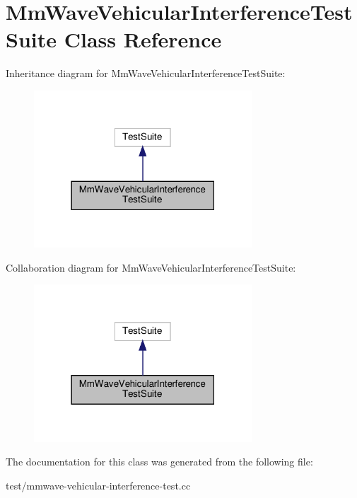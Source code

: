 \hypertarget{classMmWaveVehicularInterferenceTestSuite}{}\section{Mm\+Wave\+Vehicular\+Interference\+Test\+Suite Class Reference}
\label{classMmWaveVehicularInterferenceTestSuite}


Inheritance diagram for Mm\+Wave\+Vehicular\+Interference\+Test\+Suite\+:
\nopagebreak
\begin{figure}[H]
\begin{center}
\leavevmode
\includegraphics[width=231pt]{classMmWaveVehicularInterferenceTestSuite__inherit__graph}
\end{center}
\end{figure}


Collaboration diagram for Mm\+Wave\+Vehicular\+Interference\+Test\+Suite\+:
\nopagebreak
\begin{figure}[H]
\begin{center}
\leavevmode
\includegraphics[width=231pt]{classMmWaveVehicularInterferenceTestSuite__coll__graph}
\end{center}
\end{figure}


The documentation for this class was generated from the following file\+:\begin{DoxyCompactItemize}
\item 
test/mmwave-\/vehicular-\/interference-\/test.\+cc\end{DoxyCompactItemize}
